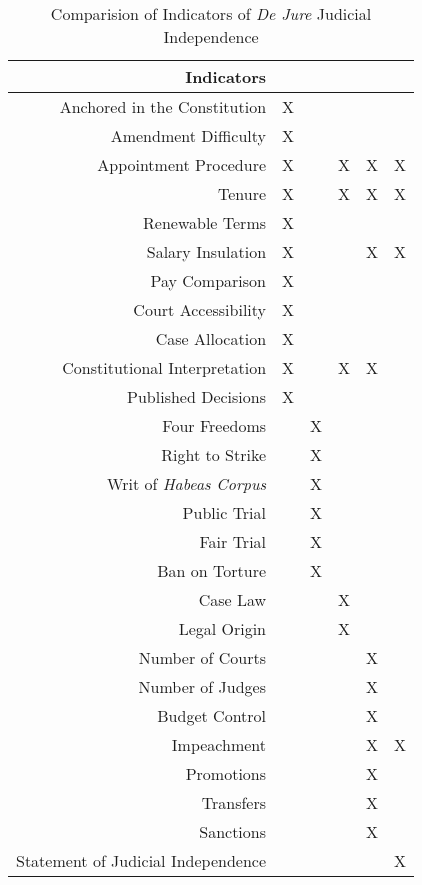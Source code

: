 \documentclass[JohnsonMADraft2.tex]{subfiles}
\begin{document}
\begin{landscape}
	\begin{table}[tb]\centering\caption{Comparision of Indicators of \textit{De Jure} Judicial Independence}\label{otherindicators}\small
		\begin{tabular}{rccccc}\hline
			Indicators	&	\citet{Feld2003}	&	\citet{Keith2002a}	&	\citet{Laporta2004}	&	\citet{Rios2006}	&	\citet{Melton2014}	\\\hline
			Anchored in the Constitution	&	X	&		&		&		&		\\
			Amendment Difficulty	&	X	&		&		&		&		\\
			Appointment Procedure	&	X	&		&	X	&	X	&	X	\\
			Tenure	&	X	&		&	X	&	X	&	X	\\
			Renewable Terms	&	X	&		&		&		&		\\
			Salary Insulation	&	X	&		&		&	X	&	X	\\
			Pay Comparison	&	X	&		&		&		&		\\
			Court Accessibility	&	X	&		&		&		&		\\
			Case Allocation	&	X	&		&		&		&		\\
			Constitutional Interpretation	&	X	&		&	X	&	X	&		\\
			Published Decisions	&	X	&		&		&		&		\\
			Four Freedoms	&		&	X	&		&		&		\\
			Right to Strike	&		&	X	&		&		&		\\
			Writ of \textit{Habeas Corpus}	&		&	X	&		&		&		\\
			Public Trial	&		&	X	&		&		&		\\
			Fair Trial	&		&	X	&		&		&		\\
			Ban on Torture	&		&	X	&		&		&		\\
			Case Law	&		&		&	X	&		&		\\
			Legal Origin	&		&		&	X	&		&		\\
			Number of Courts	&		&		&		&	X	&		\\
			Number of Judges	&		&		&		&	X	&		\\
			Budget Control	&		&		&		&	X	&		\\
			Impeachment	&		&		&		&	X	&	X	\\
			Promotions	&		&		&		&	X	&		\\
			Transfers	&		&		&		&	X	&		\\
			Sanctions	&		&		&		&	X	&		\\
			Statement of Judicial Independence	&		&		&		&		&	X	\\\hline
		\end{tabular}
	\end{table}
\end{landscape}
\restoregeometry
\end{document}
